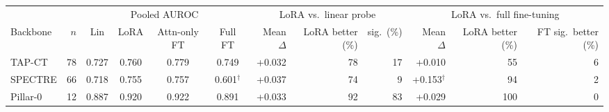 \begin{tabular}{lrccccrrrrrr}
\toprule
 & & \multicolumn{4}{c}{Pooled AUROC} & \multicolumn{3}{c}{LoRA vs.\ linear probe} & \multicolumn{3}{c}{LoRA vs.\ full fine-tuning} \\
\cmidrule(lr){3-6}\cmidrule(lr){7-9}\cmidrule(lr){10-12}
Backbone & $n$ & Lin & LoRA & Attn-only FT & Full FT & Mean $\Delta$ & LoRA better (\%) & sig.\ (\%) & Mean $\Delta$ & LoRA better (\%) & FT sig.\ better (\%) \\
\midrule
TAP-CT & 78 & 0.727 & 0.760 & 0.779 & 0.749 & +0.032 & 78 & 17 & +0.010 & 55 & 6 \\
SPECTRE & 66 & 0.718 & 0.755 & 0.757 & 0.601$^{\dagger}$ & +0.037 & 74 & 9 & +0.153$^{\dagger}$ & 94 & 2 \\
Pillar-0 & 12 & 0.887 & 0.920 & 0.922 & 0.891 & +0.033 & 92 & 83 & +0.029 & 100 & 0 \\
\bottomrule
\end{tabular}
